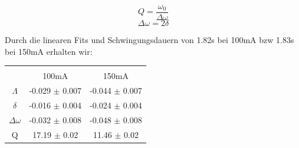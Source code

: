 \documentclass{article}
\begin{document}


$$Q=\frac{\omega_0}{\Delta \omega}$$
$$\Delta \omega=2\delta$$ 

Durch die linearen Fits und Schwingungsdauern von 1.82s bei 100mA bzw 1.83s bei 150mA erhalten wir: \\
\begin{center}
\begin{tabular}{|c|c|c|}
\hline \\
 & 100mA & 150mA \\
\hline $\Lambda$ & -0.029 $\pm$ 0.007 & -0.044 $\pm$ 0.007\\
 $\delta$ & -0.016 $\pm$ 0.004& -0.024 $\pm$ 0.004 \\
 $\Delta \omega$ & -0.032 $\pm$ 0.008 & -0.048 $\pm$ 0.008 \\
 Q &  17.19 $\pm$ 0.02 & 11.46 $\pm$ 0.02\\
 \hline
\end{tabular}
\end{center}
\end{document}
